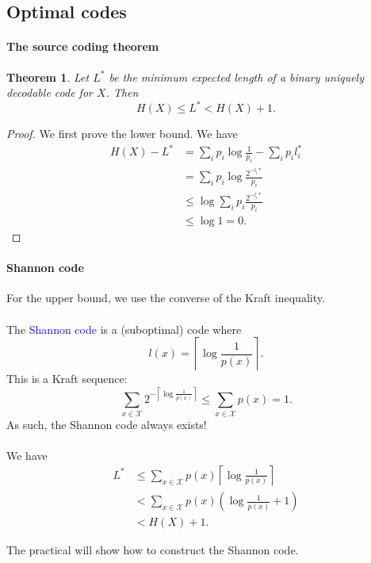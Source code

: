 \documentclass[a4paper, 11pt, openany]{book}
\numberwithin{equation}{section}
\theoremstyle{plain}
\newtheorem{theorem}	[equation]	{Theorem}
\theoremstyle{definition}
\newcommand{\Structure}[1]{\textcolor{blue}{#1}}
\newcommand{\alphabet}[1]{\mathcal{#1}}
\begin{document}
\subsection{Optimal codes}

\paragraph{The source coding theorem}

\begin{theorem}
Let $L^*$ be the minimum expected length of a binary uniquely decodable code for $X$. Then
$$
	H(X) \le L^* < H(X) + 1.
$$
\end{theorem}

\begin{proof}
We first prove the lower bound. We have
\begin{align*}
	H(X) - L^* &= \sum_i p_i \log \frac{1}{p_i} - \sum_i p_i l_i^* \\
	&= \sum_i p_i \log \frac{2^{-l_i*}}{p_i}\\
	&\le \log \sum_i p_i \frac{2^{-l_i*}}{p_i}\\
	&\le \log 1 = 0.
\end{align*}
\end{proof}



\paragraph{Shannon code}

For the upper bound, we use the converse of the Kraft inequality.\\
~\\
The \Structure{Shannon code} is a (suboptimal) code where
$$
	l(x) = \left\lceil \log \frac{1}{p(x)} \right\rceil.
$$
This is a Kraft sequence:
$$
	\sum_{x \in \alphabet{X}} 2^{-\left\lceil \log \frac{1}{p(x)} \right\rceil} \le \sum_{x \in \alphabet{X}} p(x) = 1.
$$
As such, the Shannon code always exists!\\
~\\
We have
\begin{align*}
	L^* &\le \sum_{x \in \alphabet{X}} p(x) \left\lceil \log \frac{1}{p(x)} \right\rceil\\
	&< \sum_{x \in \alphabet{X}} p(x) \left(\log \frac{1}{p(x)} + 1 \right)\\
	&< H(X) + 1.
\end{align*}

The practical will show how to construct the Shannon code.
\end{document}
